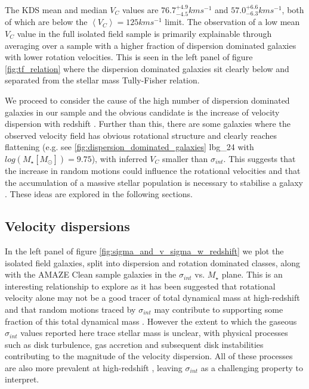 \documentclass[fleqn,usenatbib]{mn2e}
\begin{document}
The KDS mean and median $V_{C}$ values are $76.7^{+4.9}_{-4.5}kms^{-1}$ and $57.0^{+6.6}_{-6.3}kms^{-1}$, both of which are below the $\left<V_{C}\right> = 125kms^{-1}$ limit.
The observation of a low mean $V_{C}$ value in the full isolated field sample is primarily explainable through averaging over a sample with a higher fraction of dispersion dominated galaxies with lower rotation velocities.
This is seen in the left panel of figure \ref{fig:tf_relation} where the dispersion dominated galaxies sit clearly below and separated from the stellar mass Tully-Fisher relation.

We proceed to consider the cause of the high number of dispersion dominated galaxies in our sample and the obvious candidate is the increase of velocity dispersion with redshift \citep[e.g.][]{Genzel2006,Genzel2008,ForsterSchreiber2009,Law2009,Gnerucci2011,Epinat2012,Wisnioski2015}.
Further than this, there are some galaxies where the observed velocity field has obvious rotational structure and clearly reaches flattening (e.g. see \cref{fig:dispersion_dominated_galaxies} lbg\_24 with $log(M_{\star}[M_{\odot}])=9.75$), with inferred $V_{C}$ smaller than $\sigma_{int}$.
This suggests that the increase in random motions could influence the rotational velocities and that the accumulation of a massive stellar population is necessary to stabilise a galaxy \citep[e.g.][]{Law2009,Tacconi2013,Wisnioski2015}.
These ideas are explored in the following sections. 

\subsection{Velocity dispersions}\label{subsec:results_velocity_dispersions}

In the left panel of figure \ref{fig:sigma_and_v_sigma_w_redshift} we plot the isolated field galaxies, split into dispersion and rotation dominated classes, along with the AMAZE Clean sample galaxies in the $\sigma_{int}$ vs. $M_{\star}$ plane.
This is an interesting relationship to explore as it has been suggested that rotational velocity alone may not be a good tracer of total dynamical mass at high-redshift and that random motions traced by $\sigma_{int}$ may contribute to supporting some fraction of this total dynamical mass \citep[e.g.][]{Kassin2007,Kassin2012}.
However the extent to which the gaseous $\sigma_{int}$ values reported here trace stellar mass is unclear, with physical processes such as disk turbulence, gas accretion and subsequent disk instabilities contributing to the magnitude of the velocity dispersion.
All of these processes are also more prevalent at high-redshift \citep{Genzel2006,ForsterSchreiber2009,Law2009,Wisnioski2015}, leaving $\sigma_{int}$ as a challenging property to interpret. \\ 
\end{document}
